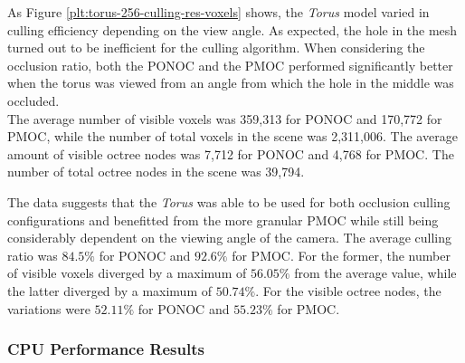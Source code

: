 
\noindent
As Figure \ref{plt:torus-256-culling-res-voxels} shows, the \emph{Torus} model varied in culling efficiency 
depending on the view angle. As expected, the hole in the mesh turned out to be inefficient for the culling 
algorithm. When considering the occlusion ratio, both the \ac{PONOC} and the \ac{PMOC} performed significantly 
better when the torus was viewed from an angle from which the hole in the middle was occluded. \\

\noindent
The average number of visible voxels was 359,313 for \ac{PONOC} and 170,772 for \ac{PMOC}, while the number 
of total voxels in the scene was 2,311,006. The average amount of visible octree nodes was 7,712 for \ac{PONOC} 
and 4,768 for \ac{PMOC}. The number of total octree nodes in the scene was 39,794. \\
\enlargethispage{\baselineskip}
\enlargethispage{\baselineskip}

\noindent
The data suggests that the \emph{Torus} was able to be used for both occlusion culling configurations and benefitted 
from the more granular \ac{PMOC} while still being considerably dependent on the viewing angle of the camera. The 
average culling ratio was $84.5\%$ for \ac{PONOC} and $92.6\%$ for \ac{PMOC}. For the former, the number of visible 
voxels diverged by a maximum of $56.05\%$ from the average value, while the latter diverged by a maximum of $50.74\%$. 
For the visible octree nodes, the variations were $52.11\%$ for \ac{PONOC} and $55.23\%$ for \ac{PMOC}.

\subsubsection*{CPU Performance Results} \label{subsubsec-cpu-performance-results-torus}

